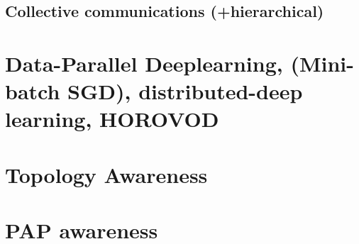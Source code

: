         \subsection{Collective communications (+hierarchical)}
    \section{Data-Parallel Deeplearning, (Mini-batch SGD), distributed-deep learning, HOROVOD}
    \cite{Ben-Nun2019DemystifyDL, Sergeev2018Horovod}
    \section{Topology Awareness}
    \section{PAP awareness}

\clearpage




